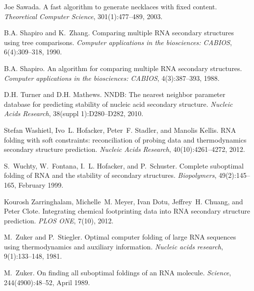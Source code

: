 \begin{DoxyDescription}
\item[\label{_CITEREF_sawada:2003}%
\mbox{[}16\mbox{]}]Joe Sawada. A fast algorithm to generate necklaces with fixed content. {\itshape Theoretical Computer Science}, 301(1)\+:477--489, 2003.


\item[\label{_CITEREF_shapiro:1990}%
\mbox{[}17\mbox{]}]B.\+A. Shapiro and K.~Zhang. Comparing multiple R\+NA secondary structures using tree comparisons. {\itshape Computer applications in the biosciences\+: C\+A\+B\+I\+OS}, 6(4)\+:309--318, 1990.


\item[\label{_CITEREF_shapiro:1988}%
\mbox{[}18\mbox{]}]B.\+A. Shapiro. An algorithm for comparing multiple R\+NA secondary structures. {\itshape Computer applications in the biosciences\+: C\+A\+B\+I\+OS}, 4(3)\+:387--393, 1988.


\item[\label{_CITEREF_turner:2010}%
\mbox{[}19\mbox{]}]D.\+H. Turner and D.\+H. Mathews. N\+N\+DB\+: The nearest neighbor parameter database for predicting stability of nucleic acid secondary structure. {\itshape Nucleic Acids Research}, 38(suppl 1)\+:D280--D282, 2010.


\item[\label{_CITEREF_washietl:2012}%
\mbox{[}20\mbox{]}]Stefan Washietl, Ivo~L. Hofacker, Peter~F. Stadler, and Manolis Kellis. R\+NA folding with soft constraints\+: reconciliation of probing data and thermodynamics secondary structure prediction. {\itshape Nucleic Acids Research}, 40(10)\+:4261--4272, 2012.


\item[\label{_CITEREF_wuchty:1999}%
\mbox{[}21\mbox{]}]S.~Wuchty, W.~Fontana, I.~L. Hofacker, and P.~Schuster. Complete suboptimal folding of R\+NA and the stability of secondary structures. {\itshape Biopolymers}, 49(2)\+:145--165, February 1999.


\item[\label{_CITEREF_zarringhalam:2012}%
\mbox{[}22\mbox{]}]Kourosh Zarringhalam, Michelle~M. Meyer, Ivan Dotu, Jeffrey~H. Chuang, and Peter Clote. Integrating chemical footprinting data into R\+NA secondary structure prediction. {\itshape P\+L\+OS O\+NE}, 7(10), 2012.


\item[\label{_CITEREF_zuker:1981}%
\mbox{[}23\mbox{]}]M.~Zuker and P.~Stiegler. Optimal computer folding of large R\+NA sequences using thermodynamics and auxiliary information. {\itshape Nucleic acids research}, 9(1)\+:133--148, 1981.


\item[\label{_CITEREF_zuker:1989}%
\mbox{[}24\mbox{]}]M.~Zuker. On finding all suboptimal foldings of an R\+NA molecule. {\itshape Science}, 244(4900)\+:48--52, April 1989.


\end{DoxyDescription}